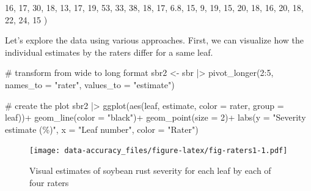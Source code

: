 \documentclass[
  letterpaper,
]{book}
\newenvironment{Shaded}{\begin{snugshade}}{\end{snugshade}}
\newcommand{\AttributeTok}[1]{\textcolor[rgb]{0.40,0.45,0.13}{#1}}
\newcommand{\CommentTok}[1]{\textcolor[rgb]{0.37,0.37,0.37}{#1}}
\newcommand{\DecValTok}[1]{\textcolor[rgb]{0.68,0.00,0.00}{#1}}
\newcommand{\FloatTok}[1]{\textcolor[rgb]{0.68,0.00,0.00}{#1}}
\newcommand{\FunctionTok}[1]{\textcolor[rgb]{0.28,0.35,0.67}{#1}}
\newcommand{\NormalTok}[1]{\textcolor[rgb]{0.00,0.23,0.31}{#1}}
\newcommand{\OtherTok}[1]{\textcolor[rgb]{0.00,0.23,0.31}{#1}}
\newcommand{\SpecialCharTok}[1]{\textcolor[rgb]{0.37,0.37,0.37}{#1}}
\newcommand{\StringTok}[1]{\textcolor[rgb]{0.13,0.47,0.30}{#1}}
\begin{document}
\begin{Shaded}
\begin{Highlighting}[]
\DecValTok{16}\NormalTok{, }\DecValTok{17}\NormalTok{,  }\DecValTok{30}\NormalTok{,   }\DecValTok{18}\NormalTok{,  }\DecValTok{13}\NormalTok{,}
\DecValTok{17}\NormalTok{, }\DecValTok{19}\NormalTok{,  }\DecValTok{53}\NormalTok{,   }\DecValTok{33}\NormalTok{,  }\DecValTok{38}\NormalTok{,}
\DecValTok{18}\NormalTok{, }\DecValTok{17}\NormalTok{, }\FloatTok{6.8}\NormalTok{,   }\DecValTok{15}\NormalTok{,   }\DecValTok{9}\NormalTok{,}
\DecValTok{19}\NormalTok{, }\DecValTok{15}\NormalTok{,  }\DecValTok{20}\NormalTok{,   }\DecValTok{18}\NormalTok{,  }\DecValTok{16}\NormalTok{,}
\DecValTok{20}\NormalTok{, }\DecValTok{18}\NormalTok{,  }\DecValTok{22}\NormalTok{,   }\DecValTok{24}\NormalTok{,  }\DecValTok{15}
\NormalTok{         )}
\end{Highlighting}
\end{Shaded}

Let's explore the data using various approaches. First, we can visualize
how the individual estimates by the raters differ for a same leaf.

\begin{Shaded}
\begin{Highlighting}[]
\CommentTok{\# transform from wide to long format}
\NormalTok{sbr2 }\OtherTok{\textless{}{-}}\NormalTok{ sbr }\SpecialCharTok{|\textgreater{}} 
  \FunctionTok{pivot\_longer}\NormalTok{(}\DecValTok{2}\SpecialCharTok{:}\DecValTok{5}\NormalTok{, }\AttributeTok{names\_to =} \StringTok{"rater"}\NormalTok{,}
               \AttributeTok{values\_to =} \StringTok{"estimate"}\NormalTok{) }

\CommentTok{\# create the plot}
\NormalTok{sbr2 }\SpecialCharTok{|\textgreater{}} 
  \FunctionTok{ggplot}\NormalTok{(}\FunctionTok{aes}\NormalTok{(leaf, estimate, }\AttributeTok{color =}\NormalTok{ rater,}
             \AttributeTok{group =}\NormalTok{ leaf))}\SpecialCharTok{+}
  \FunctionTok{geom\_line}\NormalTok{(}\AttributeTok{color =} \StringTok{"black"}\NormalTok{)}\SpecialCharTok{+}
  \FunctionTok{geom\_point}\NormalTok{(}\AttributeTok{size =} \DecValTok{2}\NormalTok{)}\SpecialCharTok{+}
  \FunctionTok{labs}\NormalTok{(}\AttributeTok{y =} \StringTok{"Severity estimate (\%)"}\NormalTok{,}
       \AttributeTok{x =} \StringTok{"Leaf number"}\NormalTok{,}
       \AttributeTok{color =} \StringTok{"Rater"}\NormalTok{)}
\end{Highlighting}
\end{Shaded}

\begin{figure}

\texttt{[image: data-accuracy\_files/figure-latex/fig-raters1-1.pdf]} \hfill{}

\caption{\label{fig-raters1}Visual estimates of soybean rust severity
for each leaf by each of four raters}

\end{figure}
\end{document}
